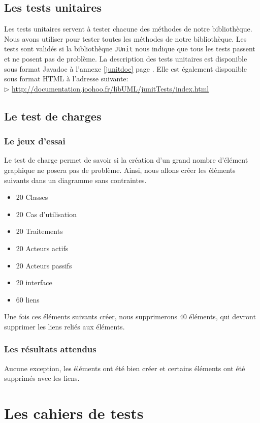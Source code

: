 \documentclass[12pt,a4paper,openany]{report}
\begin{document}
	\section{Les tests unitaires}
	Les tests unitaires servent à tester chacune des méthodes de notre bibliothèque.\\
	Nous avons utiliser  pour tester toutes les méthodes de notre bibliothèque. Les tests sont validés si 
	la bibliothèque \texttt{JUnit} nous indique que tous les tests passent et ne posent pas de problème.
	La description des tests unitaires est disponible sous format Javadoc à l'annexe \ref{junitdoc} page \pageref{junitdoc}.
	Elle est également disponible sous format HTML à l'adresse suivante: \\
	$\rhd$ \url{http://documentation.joohoo.fr/libUML/junitTests/index.html}\\
		
	\section{Le test de charges}
		\subsection{Le jeux d'essai}
		Le test de charge permet de savoir si la création d'un grand nombre d'élément graphique ne posera pas de problème. 
		Ainsi, nous allons créer les éléments suivants dans un diagramme sans contraintes.
		\begin{itemize}
			\item 20 Classes
			\item 20 Cas d'utilisation
			\item 20 Traitements
			\item 20 Acteurs actifs
			\item 20 Acteurs passifs
			\item 20 interface 
			\item 60 liens
		\end{itemize}
		Une fois ces éléments suivants créer, nous supprimerons 40 éléments, qui devront supprimer les liens reliés aux éléments.
		\subsection{Les résultats attendus}
		Aucune exception, les éléments ont été bien créer et certains éléments ont été supprimés avec les liens.
	\chapter{Les cahiers de tests}	
\end{document}
